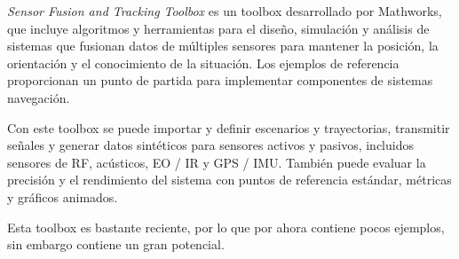 \emph{Sensor Fusion and Tracking Toolbox} \cite{Mathworks} es un toolbox desarrollado por Mathworks, que incluye algoritmos y herramientas para el diseño, simulación y análisis de sistemas que fusionan datos de múltiples sensores para mantener la posición, la orientación y el conocimiento de la situación. Los ejemplos de referencia proporcionan un punto de partida para implementar componentes de sistemas navegación.

Con este toolbox se puede importar y definir escenarios y trayectorias, transmitir señales y generar datos sintéticos para sensores activos y pasivos, incluidos sensores de RF, acústicos, EO / IR y GPS / IMU. También puede evaluar la precisión y el rendimiento del sistema con puntos de referencia estándar, métricas y gráficos animados. 

Esta toolbox es bastante reciente, por lo que por ahora contiene pocos ejemplos, sin embargo contiene un gran potencial. 